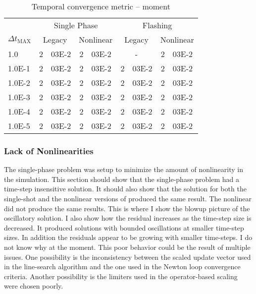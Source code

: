 \begin{table}[h!t]
\centering
\begin{tabular}{@{}l r@{.}l r@{.}l r@{.}l r@{.}l @{}}
\toprule
& \multicolumn{4}{c}{Single Phase} & \multicolumn{4}{c}{Flashing}  \\
$\Delta t_{\text{MAX}}$ & \multicolumn{2}{c}{Legacy} & \multicolumn{2}{c}{Nonlinear} & \multicolumn{2}{c}{Legacy}& \multicolumn{2}{c}{Nonlinear}  \\
\midrule
1.0    & 2&03E-2 & 2&03E-2 & \multicolumn{2}{c}{-} & 2&03E-2 \\
1.0E-1 & 2&03E-2 & 2&03E-2 & 2&03E-2 & 2&03E-2 \\
1.0E-2 & 2&03E-2 & 2&03E-2 & 2&03E-2 & 2&03E-2 \\
1.0E-3 & 2&03E-2 & 2&03E-2 & 2&03E-2 & 2&03E-2 \\
1.0E-4 & 2&03E-2 & 2&03E-2 & 2&03E-2 & 2&03E-2 \\
1.0E-5 & 2&03E-2 & 2&03E-2 & 2&03E-2 & 2&03E-2 \\
\bottomrule  
\end{tabular}
\caption{Temporal convergence metric -- moment}
\label{tab:criteria_moment}
\end{table}

\subsubsection{Lack of Nonlinearities}
\label{sect:result_linear_problem}


The single-phase problem was setup to minimize the amount of nonlinearity in the simulation.
This section should show that the single-phase problem had a time-step insensitive solution.
It should also show that the solution for both the single-shot and the nonlinear versions of \cobra{} produced the same result.
The nonlinear \cobra{} did not produce the same results.
This is where I show the blowup picture of the oscillatory solution.
I also show how the residual increases as the time-step size is decreased.
It produced solutions with bounded oscillations at smaller time-step sizes.
In addition the residuals appear to be growing with smaller time-steps.
I do not know why at the moment.
This poor behavior could be the result of multiple issues.
One possibility is the inconsistency between the scaled update vector used in the line-search algorithm and  the one used in the Newton loop convergence criteria.
Another possibility is the limiters used in the operator-based scaling were chosen poorly.

